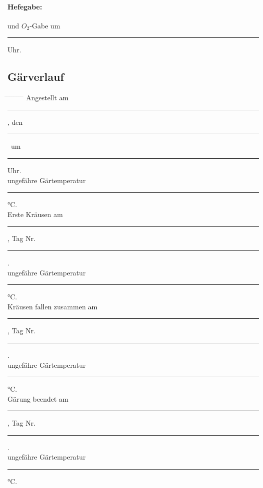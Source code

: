 \documentclass[12pt,oneside,a4paper]{scrartcl}
\newcommand{\Zeitluecke}{\rule[-0.1cm]{1.8cm}{0.5pt}}
\begin{document}
{\paragraph{Hefegabe:} und $O_2$-Gabe um \Zeitluecke Uhr.
%
\pagebreak
\subsection*{Gärverlauf}
	\begin{tabbing}
		\hspace{1cm} \= \hspace{1cm} \= \hspace{1cm} \= \hspace{1cm} \= \hspace{1cm} \= \hspace{1cm} \= \hspace{1cm} \= \hspace{1cm} \= \kill
		\> Angestellt am \rule[-0.1cm]{3cm}{0.5pt}, den \rule[-0.1cm]{4cm}{0.5pt} \ um \Zeitluecke Uhr.\\
		\> \> ungefähre Gärtemperatur \rule[-0.1cm]{1cm}{0.5pt}\si{\degreeCelsius}.\\
		\> Erste Kräusen am \rule[-0.1cm]{4cm}{0.5pt}, Tag Nr.\rule[-0.1cm]{1cm}{0.5pt} .\\
		\> \> ungefähre Gärtemperatur \rule[-0.1cm]{1cm}{0.5pt}\si{\degreeCelsius}.\\
		\> Kräusen fallen zusammen am \rule[-0.1cm]{4cm}{0.5pt}, Tag Nr. \rule[-0.1cm]{1cm}{0.5pt}.\\
		\> \> ungefähre Gärtemperatur \rule[-0.1cm]{1cm}{0.5pt}\si{\degreeCelsius}.\\
		\> Gärung beendet am \rule[-0.1cm]{4cm}{0.5pt}, Tag Nr. \rule[-0.1cm]{1cm}{0.5pt}.\\
		\> \> ungefähre Gärtemperatur \rule[-0.1cm]{1cm}{0.5pt}\si{\degreeCelsius}.
	\end{tabbing}
%
}
\end{document}
